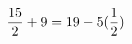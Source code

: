 \documentclass[preview]{standalone}
\begin{document}
\begin{align*}
\special{dvisvgm:raw <g id='unique000'>}\frac{15}{2} + 9 = 19 - 5 (\frac{1}{2})\special{dvisvgm:raw </g>}
\end{align*}
\end{document}

